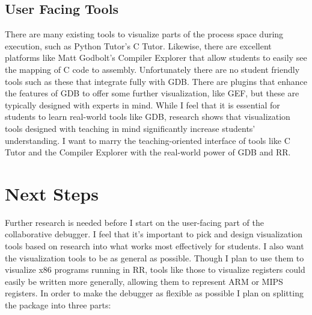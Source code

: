 \documentclass[12pt]{article}
\begin{document}
\subsection{User Facing Tools}

There are many existing tools to visualize parts of the process space
during execution, such as Python Tutor's C Tutor\cite{pythontutor}.
Likewise, there are excellent platforms like Matt Godbolt's Compiler
Explorer\cite{godbolt} that allow students to easily see the mapping
of C code to assembly.  Unfortunately there are no student friendly
tools such as these that integrate fully with GDB.  There are plugins
that enhance the features of GDB to offer some further visualization,
like GEF\cite{gef}, but these are typically designed with experts in
mind.  While I feel that it is essential for students to learn
real-world tools like GDB, research shows that visualization tools
designed with teaching in mind significantly increase students'
understanding\cite{10.1145/3328778.3366894}.  I want to marry the
teaching-oriented interface of tools like C Tutor and the Compiler
Explorer with the real-world power of GDB and RR.


\section{Next Steps}

Further research is needed before I start on the user-facing part of
the collaborative debugger.  I feel that it's important to pick and
design visualization tools based on research into what works most
effectively for students.  I also want the visualization tools to be
as general as possible.  Though I plan to use them to visualize x86
programs running in RR, tools like those to visualize registers could
easily be written more generally, allowing them to represent ARM or
MIPS registers.  In order to make the debugger as flexible as possible
I plan on splitting the package into three parts:
\end{document}
